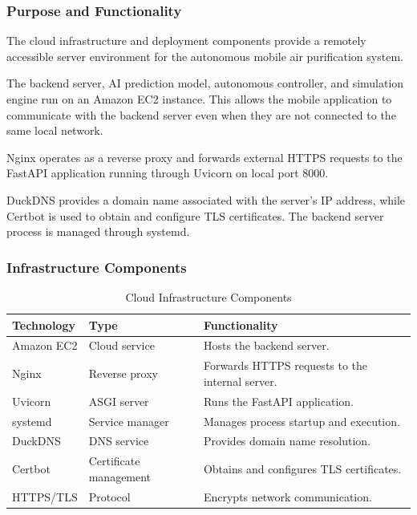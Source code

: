 \documentclass[conference]{IEEEtran}
\newlength{\tablebodywidth}
\begin{document}
\subsubsection{Purpose and Functionality}

The cloud infrastructure and deployment components provide a remotely accessible server environment for the autonomous mobile air purification system.

The backend server, AI prediction model, autonomous controller, and simulation engine run on an Amazon EC2 instance. This allows the mobile application to communicate with the backend server even when they are not connected to the same local network.

Nginx operates as a reverse proxy and forwards external HTTPS requests to the FastAPI application running through Uvicorn on local port 8000.

DuckDNS provides a domain name associated with the server's IP address, while Certbot is used to obtain and configure TLS certificates. The backend server process is managed through systemd.

\subsubsection{Infrastructure Components}

\begin{table}[!t]
\caption{Cloud Infrastructure Components}
\label{tab:t24}
\centering\footnotesize
\setlength{\tabcolsep}{3pt}
\setlength{\tablebodywidth}{\dimexpr\columnwidth-18pt\relax}
\begin{tabular}{>{\raggedright\arraybackslash}p{0.250\tablebodywidth}>{\raggedright\arraybackslash}p{0.300\tablebodywidth}>{\raggedright\arraybackslash}p{0.450\tablebodywidth}}
\toprule
\textbf{Technology} & \textbf{Type} & \textbf{Functionality} \\
\midrule
Amazon EC2 & Cloud service & Hosts the backend server. \\
Nginx & Reverse proxy & Forwards HTTPS requests to the internal server. \\
Uvicorn & ASGI server & Runs the FastAPI application. \\
systemd & Service manager & Manages process startup and execution. \\
DuckDNS & DNS service & Provides domain name resolution. \\
Certbot & Certificate management & Obtains and configures TLS certificates. \\
HTTPS/TLS & Protocol & Encrypts network communication. \\
\bottomrule
\end{tabular}
\end{table}
\end{document}
